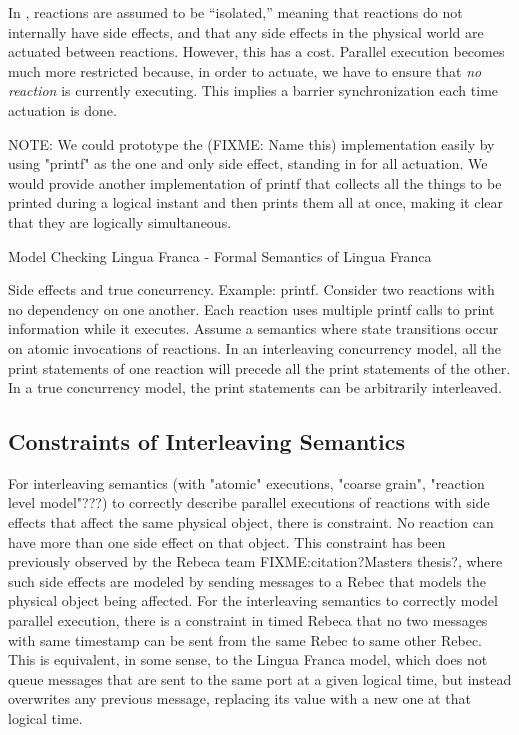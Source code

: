 \documentclass{article}
\begin{document}
In \cite{other paper}, reactions are assumed to be ``isolated,'' meaning that reactions do not
internally have side effects, and that any side effects in the physical world are actuated between
reactions. However, this has a cost. Parallel execution becomes much more restricted because,
in order to actuate, we have to ensure that \emph{no reaction} is currently executing.
This implies a barrier synchronization each time actuation is done.

NOTE: We could prototype the (FIXME: Name this) implementation easily by using "printf" as the
one and only side effect, standing in for all actuation. We would provide another implementation
of printf that collects all the things to be printed during a logical instant and then
prints them all at once, making it clear that they are logically simultaneous.

Model Checking Lingua Franca
- Formal Semantics of Lingua Franca

Side effects and true concurrency.
Example: printf. Consider two reactions with no dependency on one another.
Each reaction uses multiple printf calls to print information while it executes.
Assume a semantics where state transitions occur on atomic invocations of reactions.
In an interleaving concurrency model, all the print statements of one reaction will precede all
the print statements of the other.
In a true concurrency model, the print statements can be arbitrarily interleaved.


\subsection{Constraints of Interleaving Semantics}

For interleaving semantics (with "atomic" executions, "coarse grain", "reaction level model"???)
to correctly describe parallel executions of reactions with side effects
that affect the same physical object, there is constraint. No reaction can have more than one side effect
on that object. This constraint has been previously observed by the Rebeca team FIXME:citation?Masters thesis?,
where such side effects
are modeled by sending messages to a Rebec that models the physical object being affected.
For the interleaving semantics to correctly model parallel execution, there is a constraint
in timed Rebeca that no two messages with same timestamp can be sent from the same Rebec to same other Rebec.
This is equivalent, in some sense, to the Lingua Franca model, which does not queue messages that are
sent to the same port at a given logical time, but instead overwrites any previous message,
replacing its value with a new one at that logical time.
\end{document}
